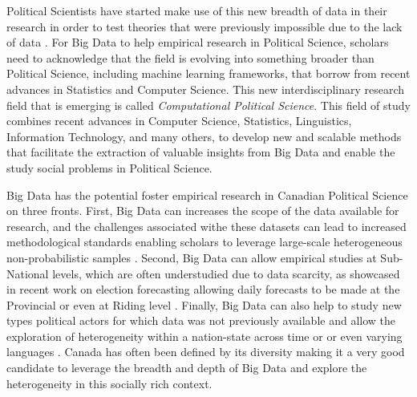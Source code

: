 \documentclass{article}
\begin{document}
Political Scientists have started make use of this new breadth of data in their research in order to test theories that were previously impossible due to the lack of data \citep{rheault2019word, temporao2018ideological}.
For Big Data to help empirical research in Political Science, scholars need to acknowledge that the field is evolving into something broader than Political Science, including machine learning frameworks, that borrow from recent advances in Statistics and Computer Science.
This new interdisciplinary research field that is emerging is called \textit{Computational Political Science}.
This field of study combines recent advances in Computer Science, Statistics, Linguistics, Information Technology, and many others, to develop new and scalable methods that facilitate the extraction of valuable insights from Big Data and enable the study social problems in Political Science.

Big Data has the potential foster empirical research in Canadian Political Science on three fronts.
First, Big Data can increases the scope of the data available for research, and the challenges associated withe these datasets can lead to increased methodological standards enabling scholars to leverage large-scale heterogeneous non-probabilistic samples \citep{ruths2014social, shiffrin2016drawing}. Second, Big Data can allow empirical studies at Sub-National levels, which are often understudied due to data scarcity, as showcased in recent work on election forecasting allowing daily forecasts to be made at the Provincial or even at Riding level \citep{temporao2019crowdsourcing}.
Finally, Big Data can also help to study new types political actors for which data was not previously available and allow the exploration of heterogeneity within a nation-state across time or or even varying languages \citep{temporao2018ideological, rheault2019word}.
Canada has often been defined by its diversity \citep{dufresne2018symbolic} making it a very good candidate to leverage the breadth and depth of Big Data and explore the heterogeneity in this socially rich context.

\newpage


\end{document}
